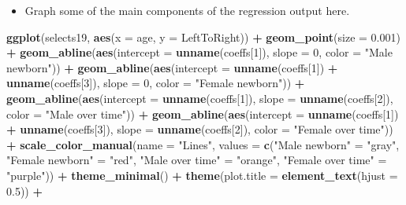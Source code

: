 \documentclass[
]{book}
\newenvironment{Shaded}{\begin{snugshade}}{\end{snugshade}}
\newcommand{\AttributeTok}[1]{\textcolor[rgb]{0.13,0.29,0.53}{#1}}
\newcommand{\DecValTok}[1]{\textcolor[rgb]{0.00,0.00,0.81}{#1}}
\newcommand{\FloatTok}[1]{\textcolor[rgb]{0.00,0.00,0.81}{#1}}
\newcommand{\FunctionTok}[1]{\textcolor[rgb]{0.13,0.29,0.53}{\textbf{#1}}}
\newcommand{\NormalTok}[1]{#1}
\newcommand{\OtherTok}[1]{\textcolor[rgb]{0.56,0.35,0.01}{#1}}
\newcommand{\SpecialCharTok}[1]{\textcolor[rgb]{0.81,0.36,0.00}{\textbf{#1}}}
\newcommand{\StringTok}[1]{\textcolor[rgb]{0.31,0.60,0.02}{#1}}
\providecommand{\tightlist}{%
  \setlength{\itemsep}{0pt}\setlength{\parskip}{0pt}}
\begin{document}
\begin{itemize}
\tightlist
\item
  Graph some of the main components of the regression output here.
\end{itemize}

\begin{Shaded}
\begin{Highlighting}[]
\FunctionTok{ggplot}\NormalTok{(selects19, }\FunctionTok{aes}\NormalTok{(}\AttributeTok{x =}\NormalTok{ age, }\AttributeTok{y =}\NormalTok{ LeftToRight)) }\SpecialCharTok{+} 
  \FunctionTok{geom\_point}\NormalTok{(}\AttributeTok{size =} \FloatTok{0.001}\NormalTok{) }\SpecialCharTok{+}
  \FunctionTok{geom\_abline}\NormalTok{(}\FunctionTok{aes}\NormalTok{(}\AttributeTok{intercept =} \FunctionTok{unname}\NormalTok{(coeffs[}\DecValTok{1}\NormalTok{]), }\AttributeTok{slope =} \DecValTok{0}\NormalTok{, }\AttributeTok{color =} \StringTok{"Male newborn"}\NormalTok{)) }\SpecialCharTok{+}
  \FunctionTok{geom\_abline}\NormalTok{(}\FunctionTok{aes}\NormalTok{(}\AttributeTok{intercept =} \FunctionTok{unname}\NormalTok{(coeffs[}\DecValTok{1}\NormalTok{]) }\SpecialCharTok{+} \FunctionTok{unname}\NormalTok{(coeffs[}\DecValTok{3}\NormalTok{]), }\AttributeTok{slope =} \DecValTok{0}\NormalTok{, }\AttributeTok{color =} \StringTok{"Female newborn"}\NormalTok{)) }\SpecialCharTok{+}
  \FunctionTok{geom\_abline}\NormalTok{(}\FunctionTok{aes}\NormalTok{(}\AttributeTok{intercept =} \FunctionTok{unname}\NormalTok{(coeffs[}\DecValTok{1}\NormalTok{]), }\AttributeTok{slope =} \FunctionTok{unname}\NormalTok{(coeffs[}\DecValTok{2}\NormalTok{]), }\AttributeTok{color =} \StringTok{"Male over time"}\NormalTok{)) }\SpecialCharTok{+}
  \FunctionTok{geom\_abline}\NormalTok{(}\FunctionTok{aes}\NormalTok{(}\AttributeTok{intercept =} \FunctionTok{unname}\NormalTok{(coeffs[}\DecValTok{1}\NormalTok{]) }\SpecialCharTok{+} \FunctionTok{unname}\NormalTok{(coeffs[}\DecValTok{3}\NormalTok{]), }\AttributeTok{slope =} \FunctionTok{unname}\NormalTok{(coeffs[}\DecValTok{2}\NormalTok{]), }\AttributeTok{color =} \StringTok{"Female over time"}\NormalTok{)) }\SpecialCharTok{+}
  \FunctionTok{scale\_color\_manual}\NormalTok{(}\AttributeTok{name =} \StringTok{"Lines"}\NormalTok{, }\AttributeTok{values =} \FunctionTok{c}\NormalTok{(}\StringTok{"Male newborn"} \OtherTok{=} \StringTok{"gray"}\NormalTok{, }\StringTok{"Female newborn"} \OtherTok{=} \StringTok{"red"}\NormalTok{, }\StringTok{"Male over time"} \OtherTok{=} \StringTok{"orange"}\NormalTok{, }\StringTok{"Female over time"} \OtherTok{=} \StringTok{"purple"}\NormalTok{)) }\SpecialCharTok{+}
  \FunctionTok{theme\_minimal}\NormalTok{() }\SpecialCharTok{+}
  \FunctionTok{theme}\NormalTok{(}\AttributeTok{plot.title =} \FunctionTok{element\_text}\NormalTok{(}\AttributeTok{hjust =} \FloatTok{0.5}\NormalTok{)) }\SpecialCharTok{+}


\end{Highlighting}
\end{Shaded}
\end{document}
